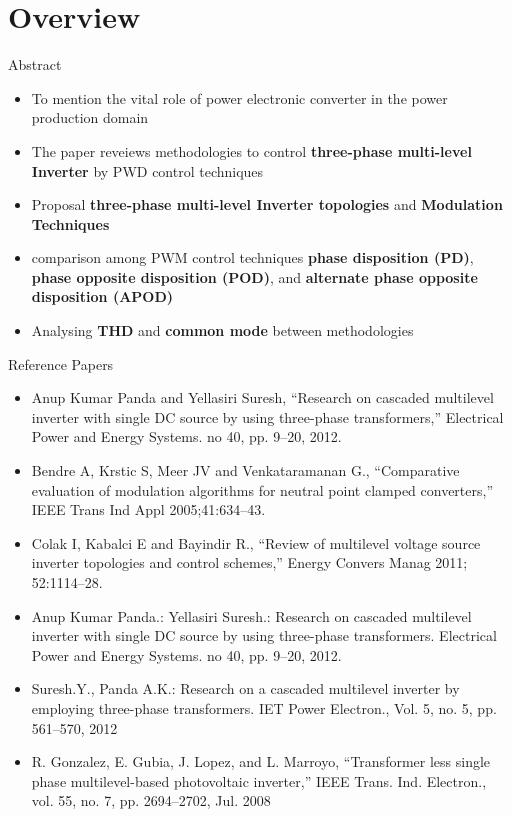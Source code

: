 \documentclass[
	11pt, %
]{beamer}
\begin{document}
\section{Overview}
\begin{frame}{Abstract}
	\begin{itemize}
		\footnotesize
		\item{To mention the vital role of power electronic converter in the power production domain}
		\item{The paper reveiews methodologies to control \textbf{three-phase multi-level Inverter} by PWD control techniques}    
		\item{Proposal \textbf{three-phase multi-level Inverter topologies} and \textbf{Modulation Techniques}}
		\item{comparison among PWM control techniques \textbf{phase disposition (PD)}, 
				\textbf{phase opposite disposition (POD)}, and \textbf{alternate phase opposite disposition (APOD)}}
		\item{Analysing \textbf{THD} and \textbf{common mode} between methodologies}
	\end{itemize}
\end{frame}


\begin{frame}{Reference Papers}
	\begin{itemize}
		\footnotesize
		\item{Anup Kumar Panda and Yellasiri Suresh, “Research on cascaded
		multilevel inverter with single DC source by using three-phase
		transformers,” Electrical Power and Energy Systems. no 40, pp. 9–20,
		2012.}
		\item{Bendre A, Krstic S, Meer JV and Venkataramanan G., “Comparative
		evaluation of modulation algorithms for neutral point clamped
		converters,” IEEE Trans Ind Appl 2005;41:634–43.}
		\item{  Colak I, Kabalci E and Bayindir R., “Review of multilevel voltage
		source inverter topologies and control schemes,” Energy Convers
		Manag 2011; 52:1114–28.}
		\item{  Anup Kumar Panda.: Yellasiri Suresh.: Research on cascaded
		multilevel inverter with single DC source by using three-phase
		transformers. Electrical Power and Energy Systems. no 40, pp. 9–20,
		2012.} 
		\item{Suresh.Y., Panda A.K.: Research on a cascaded multilevel inverter by
		employing three-phase transformers. IET Power Electron., Vol. 5, no.
		5, pp. 561–570, 2012}
		\item{R. Gonzalez, E. Gubia, J. Lopez, and L. Marroyo, “Transformer less
		single phase multilevel-based photovoltaic inverter,” IEEE Trans. Ind.
		Electron., vol. 55, no. 7, pp. 2694–2702, Jul. 2008}
	\end{itemize}
\end{frame}
\end{document}
